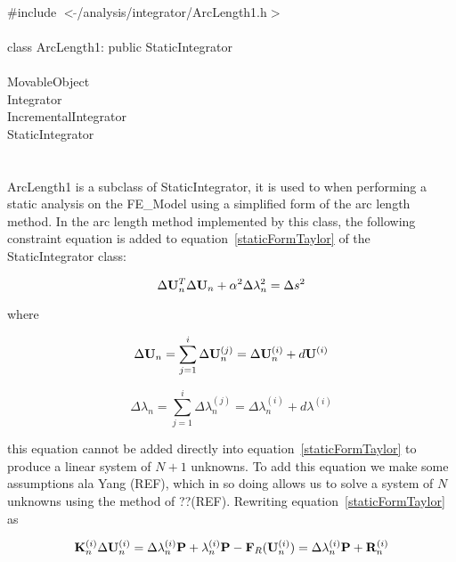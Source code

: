 
   \\
\indent \#include $<\tilde{ }$/analysis/integrator/ArcLength1.h$>$  \\

  \\
\indent class ArcLength1: public StaticIntegrator  \\

 \\
\indent MovableObject \\
\indent\indent Integrator \\
\indent\indent\indent IncrementalIntegrator \\
\indent\indent\indent\indent StaticIntegrator \\
\indent\indent\indent\indent{} \\

 \\ 
\indent ArcLength1 is a subclass of StaticIntegrator, it is
used to when performing a static analysis on the FE\_Model using a
simplified form of the arc length method. In the arc length method
implemented by this class, the following constraint equation is added to
equation~\ref{staticFormTaylor} of the StaticIntegrator class: 

\begin{equation}
\Delta {\bf U}_n^T \Delta {\bf U}_n  + \alpha^2 \Delta \lambda_n^2  = \Delta s^2
\end{equation}

where 

\[
\Delta {\bf U}_n = \sum_{j=1}^{i} \Delta {\bf U}_n^{(j)} = \Delta {\bf U}_n^{(i)} +
d{\bf U}^{(i)} 
\]

\[
\Delta \lambda_n = \sum_{j=1}^{i} \Delta \lambda_n^{(j)} = \Delta \lambda_n^{(i)} +
d\lambda^{(i)} 
\]

\noindent this equation cannot be added directly into
equation~\ref{staticFormTaylor} to produce a linear system of $N+1$
unknowns. To add this equation we make some assumptions ala Yang
(REF), which in so doing allows us to solve a system of $N$
unknowns using the method of ??(REF).  Rewriting
equation~\ref{staticFormTaylor} as  

\[
{\bf K}_n^{(i)} \Delta {\bf U}_n^{(i)} = \Delta \lambda_n^{(i)} {\bf P} +
\lambda_n^{(i)} {\bf P} - {\bf F}_R({\bf U}_n^{(i)}) = \Delta \lambda_n^{(i)} {\bf P} + {\bf R}_n^{(i)}
\]

